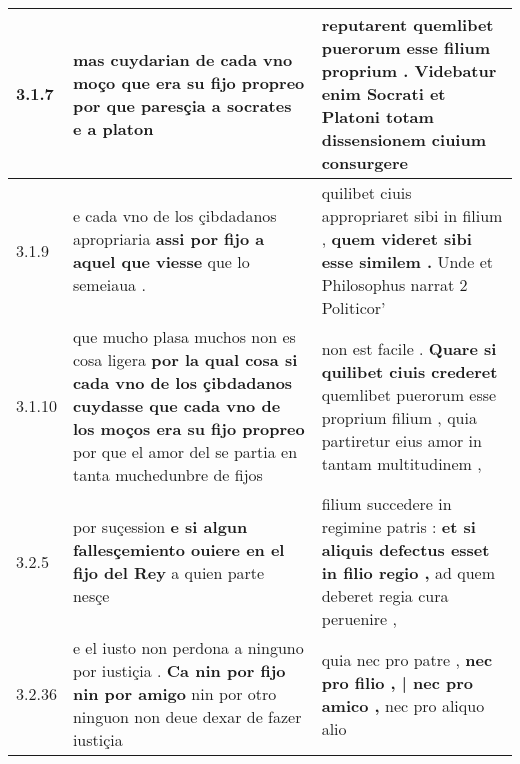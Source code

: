 \begin{tabular}{|p{1cm}|p{6.5cm}|p{6.5cm}|}
3.1.7 & mas cuydarian de cada vno moço \textbf{ que era su fijo propreo } por que paresçia a socrates e a platon & reputarent \textbf{ quemlibet puerorum esse filium proprium . } Videbatur enim Socrati et Platoni totam dissensionem ciuium consurgere \\\hline
3.1.9 & e cada vno de los çibdadanos apropriaria \textbf{ assi por fijo a aquel que viesse } que lo semeiaua . & quilibet ciuis appropriaret sibi in filium , \textbf{ quem videret sibi esse similem . } Unde et Philosophus narrat 2 Politicor’ \\\hline
3.1.10 & que mucho plasa muchos non es cosa ligera \textbf{ por la qual cosa si cada vno de los çibdadanos cuydasse que cada vno de los moços era su fijo propreo } por que el amor del se partia en tanta muchedunbre de fijos & non est facile . \textbf{ Quare si quilibet ciuis crederet } quemlibet puerorum esse proprium filium , quia partiretur eius amor in tantam multitudinem , \\\hline
3.2.5 & por suçession \textbf{ e si algun fallesçemiento ouiere en el fijo del Rey } a quien parte nesçe & filium succedere in regimine patris : \textbf{ et si aliquis defectus esset in filio regio , } ad quem deberet regia cura peruenire , \\\hline
3.2.36 & e el iusto non perdona a ninguno por iustiçia . \textbf{ Ca nin por fijo nin por amigo } nin por otro ninguon non deue dexar de fazer iustiçia & quia nec pro patre , \textbf{ nec pro filio , | nec pro amico , } nec pro aliquo alio \\\hline

\end{tabular}
